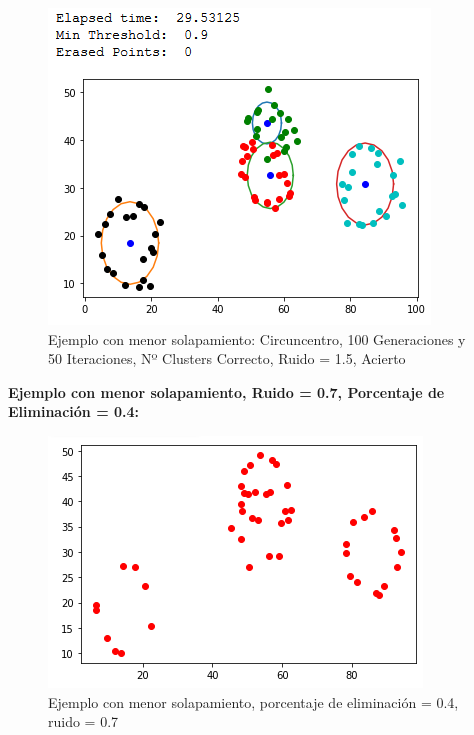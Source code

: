 \documentclass[conference,a4paper]{IEEEtran}
\begin{document}
\begin{figure}[H]
\centering
\includegraphics[scale=0.65]{Experimentacion/EjemploMenorSolapamiento/ejms_c_100_50_mr_correct}
\caption{Ejemplo con menor solapamiento: Circuncentro, 100 Generaciones y 50 Iteraciones,  Nº Clusters Correcto, Ruido = 1.5, Acierto\\}
\end{figure}

\textbf{Ejemplo con menor solapamiento, Ruido = 0.7, Porcentaje de Eliminación = 0.4:}\\

\begin{figure}[H]
\centering
\includegraphics[scale=0.8]{Experimentacion/EjemploMenorSolapamiento/EjemploMenorSolapamientoElimRuido}
\caption{Ejemplo con menor solapamiento, porcentaje de eliminación = 0.4, ruido = 0.7}
\end{figure}
\end{document}
